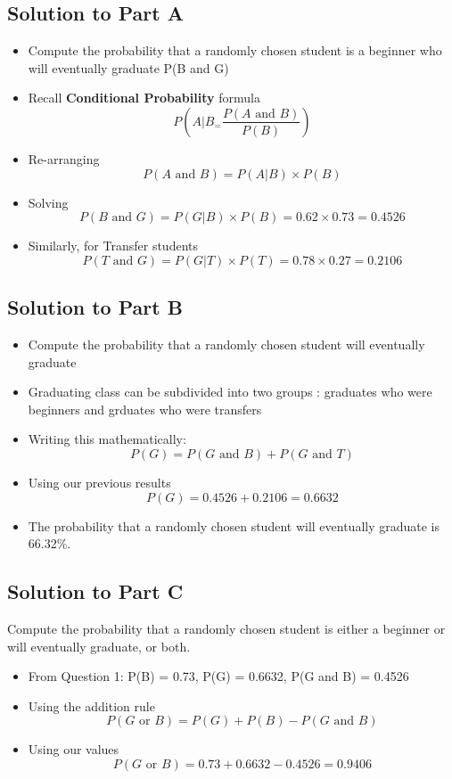 \documentclass[a4paper,12pt]{article}
\begin{document}
\subsection*{Solution to Part A}
\begin{itemize}
	\item Compute the probability that a randomly chosen student is a beginner who will
	eventually graduate P(B and G)
	\item Recall \textbf{Conditional Probability} formula
	\[P(A|B_ = \frac{P(A \mbox{ and } B)}{P(B)})\]
	\item Re-arranging
	\[P(A \mbox{ and } B) = P(A|B)\times P(B)  \]
	\item Solving
	\[P(B \mbox{ and } G) = P(G|B)\times P(B) = 0.62 \times 0.73  = 0.4526 \]
	\item Similarly, for Transfer students
	\[P(T \mbox{ and } G) = P(G|T)\times P(T) = 0.78 \times 0.27  = 0.2106 \]
\end{itemize} 

\subsection*{Solution to Part B}
\begin{itemize}
	\item Compute the probability that a randomly chosen student will eventually graduate
	\item Graduating class can be subdivided into two groups : graduates who were beginners and grduates who were transfers
	\item Writing this mathematically:
	\[P(G) = P(G \mbox{ and } B) + P(G \mbox{ and } T) \]
	\item Using our previous results
	\[P(G) = 0.4526 + 0.2106 = 0.6632 \]
	\item The probability that a randomly chosen student will eventually graduate is 66.32\%.
\end{itemize} 

\subsection*{Solution to Part C}
\noindent Compute the probability that a randomly chosen student is either a beginner or will
eventually graduate, or both.
\begin{itemize}
	\item From Question 1: P(B) = 0.73, P(G) = 0.6632, P(G and B) = 0.4526
	\item Using the addition rule
	\[P(G \mbox{ or } B) = P(G) + P(B) - P(G \mbox{ and } B)\]
	\item Using our values
	\[P(G \mbox{ or } B) = 0.73 + 0.6632 - 0.4526 = 0.9406\]
\end{itemize}
\end{document}
